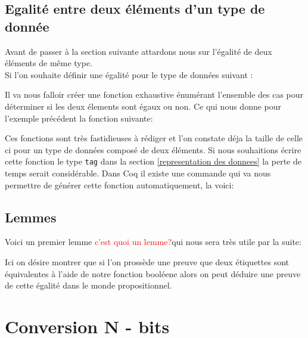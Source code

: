 \documentclass {article}
\newcommand{\codefrom}[3]
           {}
\theoremstyle{definition}
\theoremstyle{remark}
\newcommand{\todo}[1]{\textcolor{red}{#1}}
\newcommand{\fun}[1]{\lstinline!#1!}
\begin{document}
\subsection{Egalité entre deux éléments d'un type de donnée}
Avant de passer à la section suivante attardons nous sur l'égalité de deux éléments de même type.
\\
Si l'on souhaite définir une égalité pour le type de données suivant :
\codefrom{rapport}{definitions}{example_type}

Il va nous falloir créer une fonction exhaustive énumérant l'ensemble des cas pour déterminer
si les deux élements sont égaux ou non. Ce qui nous donne pour l'exemple précédent la fonction suivante:

\codefrom{rapport}{definitions}{equal}

Ces fonctions sont très fastidieuses à rédiger et l'on constate déja la taille de celle ci
pour un type de données composé de deux éléments.
Si nous souhaitions écrire cette fonction le type \fun{tag} dans
la section \ref{representation des donnees} la perte de temps serait considérable.
Dans Coq il existe une commande qui va nous permettre de générer cette fonction
automatiquement, la voici:

\codefrom{rapport}{definitions}{SchemeEqual}



\subsection{Lemmes}
\label{LemmesAST}
Voici un premier lemme \todo{c'est quoi un lemme?}qui nous sera très utile par la suite:
\codefrom{src}{ast_instructions}{tag_beq_different}
Ici on désire montrer que si l'on prossède une preuve que deux étiquettes sont équivalentes
à l'aide de notre fonction booléene alors on peut déduire une preuve
de cette égalité dans le monde propositionnel.








\section{Conversion N - bits}
\label{Section Conversion N liste B}
\end{document}

